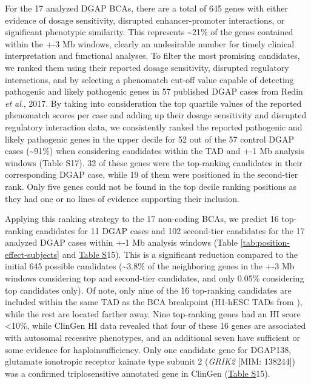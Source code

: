 \documentclass[a4paper,twoside=true,openright,parskip=full,chapterprefix=true,11pt,headings=normal,bibliography=totoc,listof=totoc,titlepage=on,captions=tableabove,draft=false]{scrreprt}
\theoremstyle{definition}
\theoremstyle{definition}
\theoremstyle{definition}
\theoremstyle{remark}
\begin{document}
For the 17 analyzed DGAP BCAs, there are a total of 645 genes with
either evidence of dosage sensitivity, disrupted enhancer-promoter
interactions, or significant phenotypic similarity. This represents
\textasciitilde{}21\% of the genes contained within the +-3 Mb windows,
clearly an undesirable number for timely clinical interpretation and
functional analyses. To filter the most promising candidates, we ranked
them using their reported dosage sensitivity, disrupted regulatory
interactions, and by selecting a phenomatch cut-off value capable of
detecting pathogenic and likely pathogenic genes in 57 published DGAP
cases from Redin \emph{et al}., 2017.\citep{Redin2017} By taking into
consideration the top quartile values of the reported phenomatch scores
per case and adding up their dosage sensitivity and disrupted regulatory
interaction data, we consistently ranked the reported pathogenic and
likely pathogenic genes in the upper decile for 52 out of the 57 control
DGAP cases (\textasciitilde{}91\%) when considering candidates within
the TAD and +-1 Mb analysis windows (Table S17). 32 of these genes were
the top-ranking candidates in their corresponding DGAP case, while 19 of
them were positioned in the second-tier rank. Only five genes could not
be found in the top decile ranking positions as they had one or no lines
of evidence supporting their inclusion.

Applying this ranking strategy to the 17 non-coding BCAs, we predict 16
top-ranking candidates for 11 DGAP cases and 102 second-tier candidates
for the 17 analyzed DGAP cases within +-1 Mb analysis windows (Table
\ref{tab:position-effect-subjects} and
\protect\hyperlink{position-effect-sub-tab}{Table S}15). This is a
significant reduction compared to the initial 645 possible candidates
(\textasciitilde{}3.8\% of the neighboring genes in the +-3 Mb windows
considering top and second-tier candidates, and only 0.05\% considering
top candidates only). Of note, only nine of the 16 top-ranking
candidates are included within the same TAD as the BCA breakpoint
(H1-hESC TADs from \citep{Dixon2012}), while the rest are located
farther away. Nine top-ranking genes had an HI score
\textless{}10\%,\citep{Huang2010} while ClinGen HI data revealed that
four of these 16 genes are associated with autosomal recessive
phenotypes, and an additional seven have sufficient or some evidence for
haploinsufficiency. Only one candidate gene for DGAP138, glutamate
ionotropic receptor kainate type subunit 2 (\emph{GRIK2} {[}MIM:
138244{]}) was a confirmed triplosensitive annotated gene in ClinGen
(\protect\hyperlink{position-effect-sub-tab}{Table S}15).
\end{document}
